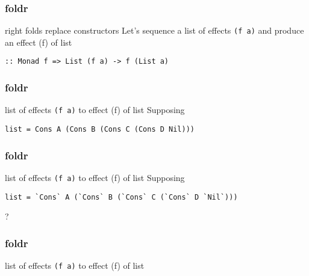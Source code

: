 %

\begin{frame}[fragile]
\frametitle{foldr}
\begin{block}{right folds replace constructors}
Let's sequence a list of effects \lstinline{(f a)} and produce an effect (f) of list

\lstinline{:: Monad f => List (f a) -> f (List a)}
\end{block}
\end{frame}

\begin{frame}[fragile]
\frametitle{foldr}
\begin{block}{list of effects \lstinline{(f a)} to effect (f) of list}
Supposing 
\begin{lstlisting}[style=haskell,basicstyle=\tiny\ttfamily,mathescape]
list = Cons A (Cons B (Cons C (Cons D Nil)))
\end{lstlisting}
\end{block}
\end{frame}

\begin{frame}[fragile]
\frametitle{foldr}
\begin{block}{list of effects \lstinline{(f a)} to effect (f) of list}
Supposing 
\begin{lstlisting}[style=haskell,basicstyle=\tiny\ttfamily,mathescape]
list = `Cons` A (`Cons` B (`Cons` C (`Cons` D `Nil`)))
\end{lstlisting}
\end{block}
\begin{center}
\LARGE
?
\end{center}
\end{frame}

\begin{frame}[fragile]
\frametitle{foldr}
\begin{block}{list of effects \lstinline{(f a)} to effect (f) of list}
\end{block}
\end{frame}

